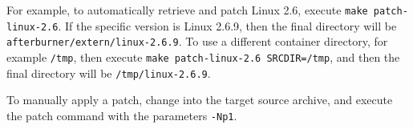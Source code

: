 \documentclass[twoside,a4paper]{report}
\newcommand{\code}[1]{{\tt #1}}
\newcommand{\cmd}[1]{\code{#1}}
\begin{document}
For example, to automatically retrieve and patch Linux 2.6, execute
\cmd{make patch-linux-2.6}.  If the specific version is Linux 2.6.9, then
the final directory will be \code{afterburner/extern/linux-2.6.9}.  To use a
different container directory, for example \code{/tmp}, then execute
\cmd{make patch-linux-2.6 SRCDIR=/tmp}, and then the final directory will be
\code{/tmp/linux-2.6.9}.

To manually apply a patch, change into the target source archive, and
execute the patch command with the parameters \code{-Np1}.
\end{document}
